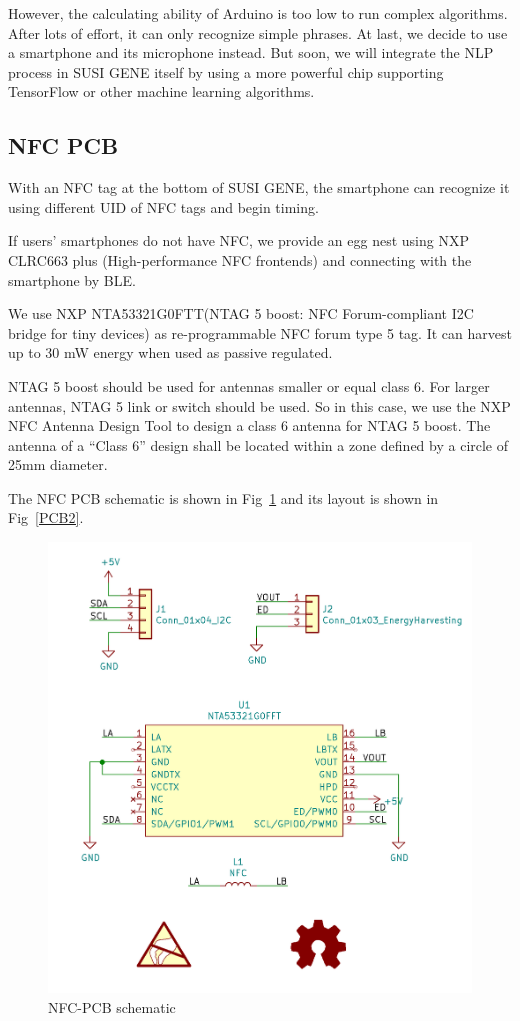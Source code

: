 \documentclass[manuscript,screen]{acmart}
\begin{document}
However, the calculating ability of Arduino is too low to run complex algorithms. After lots of effort, it can only recognize simple phrases. At last, we decide to use a smartphone and its microphone instead. But soon, we will integrate the NLP process in SUSI GENE itself by using a more powerful chip supporting TensorFlow or other machine learning algorithms. 

\subsection{NFC PCB}

With an NFC tag at the bottom of SUSI GENE, the smartphone can recognize it using different UID of NFC tags and begin timing.

If users' smartphones do not have NFC, we provide an egg nest using NXP CLRC663 plus (High-performance NFC frontends) and connecting with the smartphone by BLE.

We use NXP NTA53321G0FTT(NTAG 5 boost: NFC Forum-compliant I2C bridge for tiny devices) as re-programmable NFC forum type 5 tag. It can harvest up to 30 mW energy when used as passive regulated.

NTAG 5 boost should be used for antennas smaller or equal class 6. For larger antennas, NTAG 5 link or switch should be used. So in this case, we use the NXP NFC Antenna Design Tool to design a class 6 antenna for NTAG 5 boost. The antenna of a “Class 6” design shall be located within a zone defined by a circle of 25mm diameter.

The NFC PCB schematic is shown in Fig~\ref{PCBsch2} and its layout is shown in Fig~\ref{PCB2}.

\begin{figure}[h]
  \centering
  \includegraphics[width=0.7\linewidth]{PCBsch2.png}
  \caption{NFC-PCB schematic}
  \label{PCBsch2}
\end{figure}
\end{document}
